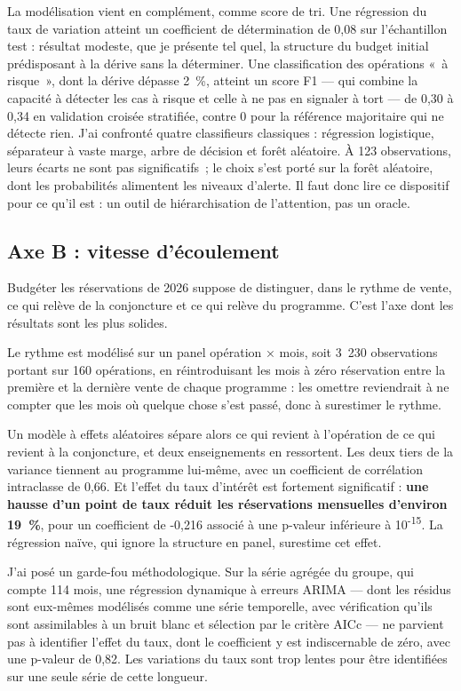 La modélisation vient en complément, comme score de tri. Une régression du taux de variation
atteint un coefficient de détermination de 0,08 sur l'échantillon test : résultat modeste, que
je présente tel quel, la structure du budget initial prédisposant à la dérive sans la
déterminer. Une classification des opérations «~à risque~», dont la dérive dépasse 2~\%, atteint
un score F1 --- qui combine la capacité à détecter les cas à risque et celle à ne pas en
signaler à tort --- de 0,30 à 0,34 en validation croisée stratifiée, contre 0 pour la référence
majoritaire qui ne détecte rien. J'ai confronté quatre classifieurs classiques : régression
logistique, séparateur à vaste marge, arbre de décision et forêt aléatoire. À 123
observations, leurs écarts ne sont pas significatifs~; le choix s'est porté sur la forêt
aléatoire, dont les probabilités alimentent les niveaux d'alerte. Il faut donc lire ce
dispositif pour ce qu'il est : un outil de hiérarchisation de l'attention, pas un oracle.

\hypertarget{axe-b-vitesse-duxe9coulement}{%
\subsection{Axe B : vitesse d'écoulement}\label{axe-b-vitesse-duxe9coulement}}

Budgéter les réservations de 2026 suppose de distinguer, dans le rythme de vente, ce qui
relève de la conjoncture et ce qui relève du programme. C'est l'axe dont les résultats sont
les plus solides.

Le rythme est modélisé sur un panel opération × mois, soit 3~230 observations portant sur 160
opérations, en réintroduisant les mois à zéro réservation entre la première et la dernière
vente de chaque programme : les omettre reviendrait à ne compter que les mois où quelque chose
s'est passé, donc à surestimer le rythme.

Un modèle à effets aléatoires sépare alors ce qui revient à l'opération de ce qui revient à la
conjoncture, et deux enseignements en ressortent. Les deux tiers de la variance tiennent au
programme lui-même, avec un coefficient de corrélation intraclasse de 0,66. Et l'effet du taux
d'intérêt est fortement significatif : \textbf{une hausse d'un point de taux réduit les réservations
mensuelles d'environ 19~\%}, pour un coefficient de -0,216 associé à une p-valeur inférieure à
10\textsuperscript{-15}. La régression naïve, qui ignore la structure en panel, surestime cet effet.

J'ai posé un garde-fou méthodologique. Sur la série agrégée du groupe, qui compte 114 mois,
une régression dynamique à erreurs ARIMA --- dont les résidus sont eux-mêmes modélisés comme une
série temporelle, avec vérification qu'ils sont assimilables à un bruit blanc et sélection par
le critère AICc --- ne parvient pas à identifier l'effet du taux, dont le coefficient y est
indiscernable de zéro, avec une p-valeur de 0,82. Les variations du taux sont trop lentes pour
être identifiées sur une seule série de cette longueur.

